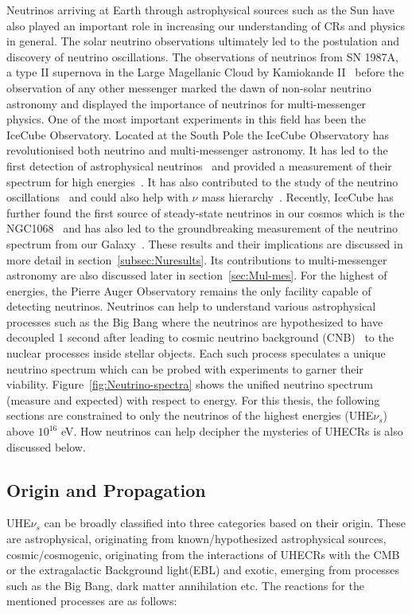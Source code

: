 Neutrinos arriving at Earth through astrophysical sources such as the Sun have also played an important role in increasing our understanding of CRs and physics in general. The solar neutrino observations ultimately led to the postulation and discovery of neutrino oscillations. The observations of neutrinos from SN 1987A, a type II supernova in the Large Magellanic Cloud by Kamiokande II~\cite{PhysRevLett.58.1490} before the observation of any other messenger marked the dawn of non-solar neutrino astronomy and displayed the importance of neutrinos for multi-messenger physics. One of the most important experiments in this field has been the IceCube Observatory. Located at the South Pole the IceCube Observatory has revolutionised both neutrino and multi-messenger astronomy. It has led to the first detection of astrophysical neutrinos~\cite{PhysRevLett.111.021103} and provided a measurement of their spectrum for high energies~\cite{doi:10.1126/science.1242856}. It has also contributed to the study of the neutrino oscillations~\cite{Abbasi_2023_Oscillation} and could also help with $\nu$ mass hierarchy~\cite{psf2023008007}. Recently, IceCube has further found the first source of steady-state neutrinos in our cosmos which is the NGC1068~\cite{Icecube_2022} and has also led to the groundbreaking measurement of the neutrino spectrum from our Galaxy~\cite{Galactic_plane_nu_2023}. These results and their implications are discussed in more detail in section~\ref{subsec:Nuresults}. Its contributions to multi-messenger astronomy are also discussed later in section~\ref{sec:Mul-mes}. For the highest of energies, the Pierre Auger Observatory remains the only facility capable of detecting neutrinos. 
Neutrinos can help to understand various astrophysical processes such as the Big Bang where the neutrinos are hypothesized to have decoupled 1 second after leading to cosmic neutrino background (CNB)~\cite{scott2024cosmicneutrinobackground} to the nuclear processes inside stellar objects. Each such process speculates a unique neutrino spectrum which can be probed with experiments to garner their viability. Figure~\ref{fig:Neutrino-spectra} shows the unified neutrino spectrum (measure and expected) with respect to energy. For this thesis, the following sections are constrained to only the neutrinos of the highest energies (UHE$\nu_s$) above $10^16$ eV. How neutrinos can help decipher the mysteries of UHECRs is also discussed below.

\subsection{Origin and Propagation}
\label{subsec:nuorig}
UHE$\nu_s$ can be broadly classified into three categories based on their origin. These are astrophysical, originating from known/hypothesized astrophysical sources, cosmic/cosmogenic, originating from the interactions of UHECRs with the CMB or the extragalactic Background light(EBL) and exotic, emerging from processes such as the Big Bang, dark matter annihilation etc. The reactions for the mentioned processes are as follows:


